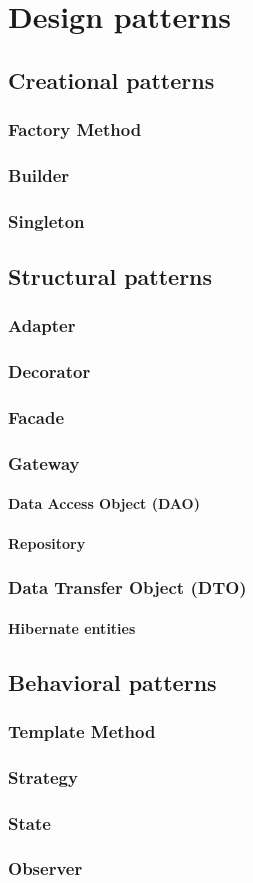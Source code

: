 \chapter{Design patterns}

\section{Creational patterns}
\subsection{Factory Method}
\subsection{Builder}
\subsection{Singleton}

\section{Structural patterns}
\subsection{Adapter}
\subsection{Decorator}
\subsection{Facade}
\subsection{Gateway}
\subsubsection{Data Access Object (DAO)}
\subsubsection{Repository}
\subsection{Data Transfer Object (DTO)}
\subsubsection{Hibernate entities}

\section{Behavioral patterns}
\subsection{Template Method}
\subsection{Strategy}
\subsection{State}
\subsection{Observer}